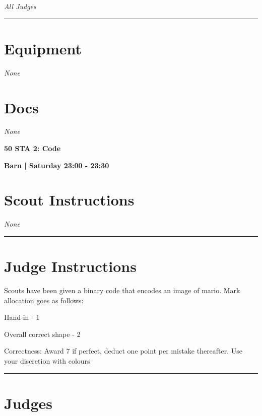 \documentclass[10pt]{article}
\newcommand{\newtitle}[1]{\begin{center}{\Huge\bfseries #1 }\\ \vspace{5mm}\end{center}}
\newcommand{\newsubtitle}[1]{\begin{center}{\color{grey}\Large\bfseries #1 }\\ \vspace{5mm}\end{center}}
\begin{document}
					\textit{All Judges}
			\vspace{0.5cm}
	\hrule
	\vspace{0.5cm}

	\begin{multicols}{2}

		\section*{\faWrench \: Equipment}

				\textit{None}
		
		\vfill\null
		\columnbreak

			\section*{\faFile \: Docs}
		 	\textit{None}
	

		\vfill\null

		\end{multicols}



	\vspace{1cm}


	\clearpage
		\newtitle{50 STA 2: Code }
	\newsubtitle{Barn | Saturday 23:00 - 23:30}
		\setcounter{section}{49}
	\section*{Scout Instructions}
		\textit{None}
	
	\vspace{0.5cm}
	\hrule
	\vspace{0.5cm}

		\section*{Judge Instructions}
		Scouts have been given a binary code that encodes an image of mario. Mark allocation goes as follows:



Hand-in  - 1

Overall correct shape - 2

Correctness: Award 7 if perfect, deduct one point per mistake thereafter. Use your discretion with colours
\vspace{0.5cm}
	\hrule
	\vspace{0.5cm}
		\section*{\faUsers \: Judges}
\end{document}
